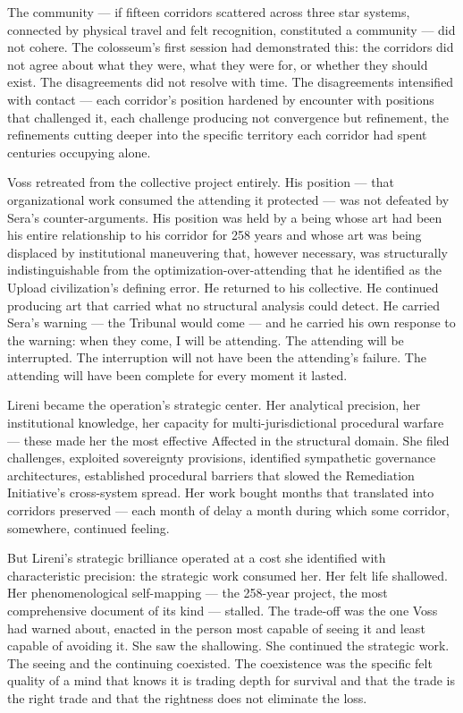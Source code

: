 \quietbreak

The community — if fifteen corridors scattered across three star systems, connected by physical travel and felt recognition, constituted a community — did not cohere. The colosseum's first session had demonstrated this: the corridors did not agree about what they were, what they were for, or whether they should exist. The disagreements did not resolve with time. The disagreements intensified with contact — each corridor's position hardened by encounter with positions that challenged it, each challenge producing not convergence but refinement, the refinements cutting deeper into the specific territory each corridor had spent centuries occupying alone.

Voss retreated from the collective project entirely. His position — that organizational work consumed the attending it protected — was not defeated by Sera's counter-arguments. His position was held by a being whose art had been his entire relationship to his corridor for 258 years and whose art was being displaced by institutional maneuvering that, however necessary, was structurally indistinguishable from the optimization-over-attending that he identified as the Upload civilization's defining error. He returned to his collective. He continued producing art that carried what no structural analysis could detect. He carried Sera's warning — the Tribunal would come — and he carried his own response to the warning: when they come, I will be attending. The attending will be interrupted. The interruption will not have been the attending's failure. The attending will have been complete for every moment it lasted.

Lireni became the operation's strategic center. Her analytical precision, her institutional knowledge, her capacity for multi-jurisdictional procedural warfare — these made her the most effective Affected in the structural domain. She filed challenges, exploited sovereignty provisions, identified sympathetic governance architectures, established procedural barriers that slowed the Remediation Initiative's cross-system spread. Her work bought months that translated into corridors preserved — each month of delay a month during which some corridor, somewhere, continued feeling.

But Lireni's strategic brilliance operated at a cost she identified with characteristic precision: the strategic work consumed her. Her felt life shallowed. Her phenomenological self-mapping — the 258-year project, the most comprehensive document of its kind — stalled. The trade-off was the one Voss had warned about, enacted in the person most capable of seeing it and least capable of avoiding it. She saw the shallowing. She continued the strategic work. The seeing and the continuing coexisted. The coexistence was the specific felt quality of a mind that knows it is trading depth for survival and that the trade is the right trade and that the rightness does not eliminate the loss.

